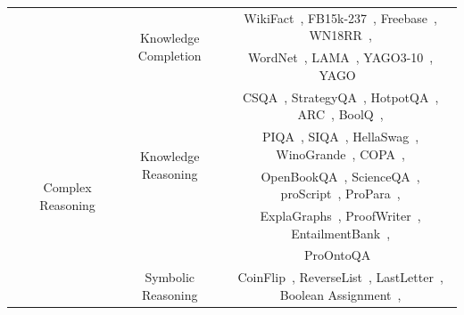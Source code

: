 \begin{table}[htbp]
\begin{tabular}{cccc}
          &  &\multirow{2}{*}{Knowledge Completion}          & 
                WikiFact~\cite{Goodrich-KDD-2019-Assessing}, 
                FB15k-237~\cite{Toutanova-CVSC-2015-Observed}, 
                Freebase~\cite{Bollacker-SIGMOD-2008-Freebase}, 
                WN18RR~\cite{Dettmers-AAAI-2018-Convolutional}, \\
          &  &           &
                WordNet~\cite{Miller-Commun-1995-WordNet},
                LAMA~\cite{Petroni-EMNLP-2019-Language}, 
                YAGO3-10~\cite{Mahdisoltani-CIDR-2015-YAGO3}, 
                YAGO~\cite{Suchanek-WWW-2007-Yago}\\ 
        \cmidrule(r){2-4}
        & \multirow{12}{*}{Complex Reasoning}      &\multirow{4}{*}{Knowledge Reasoning}           &  CSQA~\cite{Talmor-naacl-2019-CommonsenseQA}, StrategyQA~\cite{Geva-tacl-2021-Did}, HotpotQA~\cite{yang-2018-acl-HotpotQA}, ARC~\cite{Clark-arxiv-2018-Think}, BoolQ~\cite{Clark-naacl-2019-BoolQ},  \\ 
                                              &  &   &
                                                PIQA~\cite{Bisk-AAAI-2020-PIQA},
                                                SIQA~\cite{Sap-arxiv-2019-SocialIQA}, HellaSwag~\cite{Zellers-acl-2019-HellaSwag}, WinoGrande~\cite{Sakaguchi-aaai-2020-WinoGrande}, 
                                                COPA~\cite{Roemmele-aaai-2011-Choice}, \\
                                             &  &   &
                                                OpenBookQA~\cite{Mihaylov-EMNLP-2018-Can},
                                                 ScienceQA~\cite{Saikh-IJDL-2022-ScienceQA}, proScript~\cite{Sakaguchi-acl-2021-proScript}, ProPara~\cite{Dalvi-acl-2018-Tracking},  \\ 
                                              &  &   &
                                                ExplaGraphs~\cite{Saha-acl-2021-ExplaGraphs},
                                                ProofWriter~\cite{Tafjord-acl-2021-ProofWriter},  EntailmentBank~\cite{Dalvi-acl-2021-Explaining},  \\ 
                                            &  &   &
                                                ProOntoQA~\cite{Saparov-arxiv-2022-Language}  \\ 
                                                \addlinespace
                                             &   &\multirow{3}{*}{Symbolic Reasoning}            & 
                                                CoinFlip~\cite{Wei-arxiv-2022-chain}, ReverseList~\cite{Wei-arxiv-2022-chain},  LastLetter~\cite{Wei-arxiv-2022-chain}, Boolean Assignment~\cite{Anil-arxiv-2022-Exploring},

\end{tabular}
\end{table}
